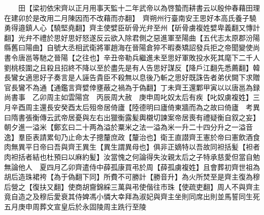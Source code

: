 　　田【梁初依宋齊以正月用事天監十二年武帝以為啓蟄而耕書云以殷仲春藉田理在建卯於是改用二月陳因而不改藉而亦翻】　齊朔州行臺南安王思好本高氏養子驍勇得邉鎮人心【驍堅堯翻】齊主使嬖臣斫骨光弁至州【斫骨虜複姓嬖卑義翻又慱計翻】光弁不禮於思好思好怒遂反云欲入除君側之惡進軍至陽曲【五代志太原郡汾陽縣舊曰陽曲】自號大丞相武衛將軍趙海在晉陽倉猝不暇奏矯詔發兵拒之帝聞變使尚書令唐邕等馳之晉陽【之往也】辛丑帝勒兵繼進未至思好軍敗投水死其麾下二千人劉桃枝圍之且殺且招終不降以至於盡先是有人告思好謀反【降戶江翻先悉薦翻】韓長鸞女適思好子奏言是人誣告貴臣不殺無以息後乃斬之思好既誅告者弟伏闕下求贈官長鸞不為通【通鑑言齊嬖倖壅蔽之禍為于偽翻】丁未齊王還鄴甲寅以以唐邕為録尚書事　乙卯周主如雲陽宫　丙辰周大赦　庚申周叱奴太后有疾【叱奴虜複姓】三月辛酉周主還長安癸酉太后殂帝居倚廬【陸德明曰廬倚東牆而為之故曰倚廬　考異曰隋書張衡傳云武帝居憂與左右出獵衡露髪輿櫬切諫案帝居喪有禮疑衡自叙之妄】朝夕進一溢米【鄭玄曰二十两為溢於粟米之法一溢為米一升二十四分升之一溢音逸】羣臣表請累旬乃止命太子摠釐庶政【釐治也】衛王直譛齊王憲於帝曰憲飲酒食肉無異平日帝曰吾與齊王異生【異生謂異母也】俱非正嫡特以吾故同袒括髪【袒者肉袒括者結也杜預曰以麻約髪】汝當愧之何論得失汝親太后之子特承慈愛但當自勉無論他人　夏四月乙卯齊遣侍中薛孤康買弔於周【薛孤虜複姓】且會葬初齊世祖為胡后造珠裙袴【為于偽翻下同】所費不可勝計【勝音升】為火所焚至是齊主復為穆后營之【復扶又翻】使商胡齎錦綵三萬與弔使偕往市珠【使疏吏翻】周人不與齊主竟自造之及穆后愛衰其侍婢馮小憐大幸拜為淑妃與齊主坐則同席出則並馬誓同生死五月庚申周葬文宣皇后於永固陵周主跣行至陵

